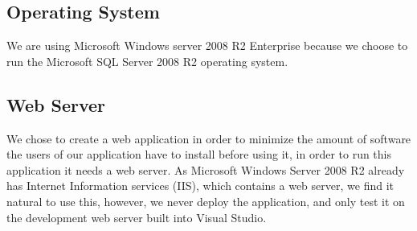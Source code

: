 \subsection{Operating System}
\label{subsec:operating_system}
We are using Microsoft Windows server 2008 R2 Enterprise because we choose to run the Microsoft SQL Server 2008 R2 operating system. 

\subsection{Web Server}
\label{subsec:webserver}


We chose to create a web application in order to minimize the amount of software the users of our application have to install before using it, in order to run this application it needs a web server. As Microsoft Windows Server 2008 R2 already has Internet Information services (IIS), which contains a web server, we find it natural to use this, however, we never deploy the application, and only test it on the development web server built into Visual Studio.



